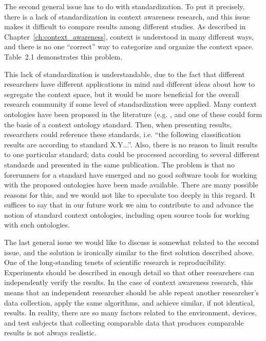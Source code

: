 The second general issue has to do with standardization. To put it precisely, there is a lack of standardization in context awareness research, and this issue makes it difficult to compare results among different studies. As described in Chapter~\ref{ch:context_awareness}, context is understood in many different ways, and there is no one ``correct'' way to categorize and organize the context space. Table~2.1 demonstrates this problem.

This lack of standardization is understandable, due to the fact that different researchers have different applications in mind and different ideas about how to segregate the context space, but it would be more beneficial for the overall research community if some level of standardization were applied. Many context ontologies have been proposed in the literature (e.g. \cite{guermah2014ontology} \cite{chen2003ontology} \cite{wang2004ontology} \cite{gu2004ontology} \cite{strang2003cool}, and one of these could form the basis of a context ontology standard. Then, when presenting results, researchers could reference these standards, i.e. ``the following classification results are according to standard X.Y...''. Also, there is no reason to limit results to one particular standard; data could be processed according to several different standards and presented in the same publication. The problem is that no forerunners for a standard have emerged and no good software tools for working with the proposed ontologies have been made available. There are many possible reasons for this, and we would not like to speculate too deeply in this regard. It suffices to say that in our future work we aim to contribute to and advance the notion of standard context ontologies, including open source tools for working with such ontologies.
%


The last general issue we would like to discuss is somewhat related to the second issue, and the solution is ironically similar to the first solution described above. One of the long-standing tenets of scientific research is reproducibility. Experiments should be described in enough detail so that other researchers can independently verify the results. In the case of context awareness research, this means that an independent researcher should be able repeat another researcher's data collection, apply the same algorithms, and achieve similar, if not identical, results. In reality, there are so many factors related to the environment, devices, and test subjects that collecting comparable data that produces comparable results is not always realistic.

